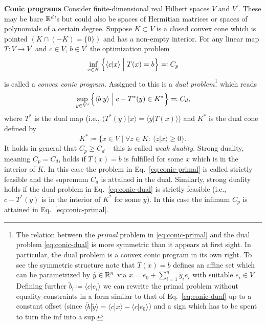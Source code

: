 \documentclass{article}
\numberwithin{equation}{section}
\begin{document}
\noindent\textbf{Conic programs}
Consider finite-dimensional real Hilbert spaces $V$ and $V^\prime$. These may
be bare $\mathbb{R}^d$'s but could also be spaces of Hermitian matrices or spaces of
polynomials of a certain degree. Suppose $K\subset V$ is a closed convex cone
which is pointed $(K\cap (-K)=\{0\})$ and has a non-empty interior. For any
linear map $T:V\to V^\prime$ and $c\in V$, $b\in V^\prime$ the optimization
problem
\begin{equation}\label{eq:conic-primal}
    \inf_{x\in K}\left\{\langle c|x\rangle \Bigm| T(x)=b\right\} \eqqcolon C_p
\end{equation}
is called a \emph{convex conic program}. Assigned to this is a \emph{dual
    problem}\footnote{The relation between the \emph{primal} problem in
    \eqref{eq:conic-primal} and the dual problem \eqref{eq:conic-dual} is more
    symmetric than it appears at first sight. In particular, the dual problem is a
    convex conic program in its own right. To see the symmetric structure note that
    $T(x)=b$ defines an affine set which can be parametrized by
    $\tilde{y}\in \mathbb{R}^n$ via $x=e_0+\sum_{i=1}^n \tilde{y}_i e_i$ with suitable
    $e_i\in V$. Defining further $\tilde{b}_i \coloneqq \langle c|e_i\rangle$ we can
    rewrite the primal problem without equality constraints in a form similar to
    that of Eq.~\eqref{eq:conic-dual} up to a constant offset (since
    $\langle \tilde{b}|\tilde{y}\rangle=\langle c|x\rangle-\langle c|e_0\rangle$)
    and a sign which has to be spent to turn the inf into a sup.}
which reads
\begin{equation}\label{eq:conic-dual}
    \sup_{y\in V^\prime}\left\{\langle b|y\rangle \Bigm| c-T^{*}(y)\in K^{*}\right\}
    \eqqcolon C_d,
\end{equation}
where $T^{*}$ is the dual map (i.e., $\langle T^{*}(y)|x\rangle=\langle y|T(x)\rangle$)
and $K^{*}$ is the dual cone defined by
\[
    K^{*} \coloneqq \{x\in V \mid \forall z\in K:\ \langle z|x\rangle \ge 0\}.
\]
It holds in general that $C_p\ge C_d$ -- this is called \emph{weak duality}.
Strong duality, meaning $C_p=C_d$, holds if $T(x)=b$ is fulfilled for some $x$
which is in the interior of $K$. In this case the problem in
Eq.~\eqref{eq:conic-primal} is called strictly feasible and the supremum $C_d$
is attained in the dual. Similarly, strong duality holds if the dual problem in
Eq.~\eqref{eq:conic-dual} is strictly feasible (i.e., $c-T^{*}(y)$ is in the
interior of $K^{*}$ for some $y$). In this case the infimum $C_p$ is attained
in Eq.~\eqref{eq:conic-primal}.
\end{document}
